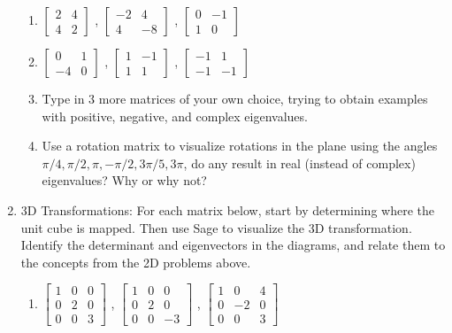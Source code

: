 \begin{enumerate}
\begin{enumerate}
\item
	$\begin{bmatrix}
	2 &4 \\
	4 &2
	\end{bmatrix}$
,	$\begin{bmatrix}
	-2 &4 \\
	4 &-8
	\end{bmatrix}$
,	$\begin{bmatrix}
	0 &-1 \\
	1 &0
	\end{bmatrix}$
\item
	$\begin{bmatrix}
	0 &1 \\
	-4 &0
	\end{bmatrix}$
,	$\begin{bmatrix}
	1 &-1 \\
	1 &1
	\end{bmatrix}$
,	$\begin{bmatrix}
	-1 &1 \\
	-1 &-1
	\end{bmatrix}$
\item Type in 3 more matrices of your own choice, trying to obtain examples with positive, negative, and complex eigenvalues.
\item Use a rotation matrix to visualize rotations in the plane using the angles $\pi/4, \pi/2, \pi, -\pi/2, 3\pi/5, 3\pi$, do any result in real (instead of complex) eigenvalues? Why or why not? 
\end{enumerate}







\item 3D Transformations:
For each matrix below, start by determining where the unit cube is mapped.  Then use Sage to visualize the 3D transformation.  Identify the determinant and eigenvectors in the diagrams, and relate them to the concepts from the 2D problems above.
\begin{enumerate}
\item 
	$\begin{bmatrix}
	1 &0 &0\\
	0 &2 &0\\
	0 &0 &3
	\end{bmatrix}$
,	$\begin{bmatrix}
	1 &0 &0\\
	0 &2 &0\\
	0 &0 &-3
	\end{bmatrix}$
,	$\begin{bmatrix}
	1 &0 &4\\
	0 &-2 &0\\
	0 &0 &3
	\end{bmatrix}$


\end{enumerate}
\end{enumerate}
